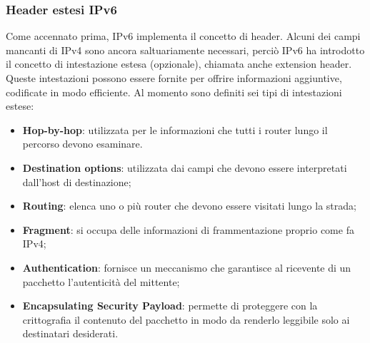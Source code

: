             \subsubsection*{Header estesi IPv6}
            Come accennato prima, IPv6 implementa il concetto di header. Alcuni dei campi mancanti di
            IPv4 sono ancora saltuariamente necessari, perciò IPv6 ha introdotto il concetto di intestazione
            estesa (opzionale), chiamata anche extension header. Queste intestazioni possono essere
            fornite per offrire informazioni aggiuntive, codificate in modo efficiente. Al momento sono
            definiti sei tipi di intestazioni estese:

            \begin{itemize}
                \item \textbf{Hop-by-hop}: utilizzata per le informazioni che tutti i router lungo il percorso devono
                esaminare.
                \item \textbf{Destination options}: utilizzata dai campi che devono essere interpretati dall’host di
                destinazione;
                \item \textbf{Routing}: elenca uno o più router che devono essere visitati lungo la strada;
                \item \textbf{Fragment}: si occupa delle informazioni di frammentazione proprio come fa IPv4;
                \item \textbf{Authentication}: fornisce un meccanismo che garantisce al ricevente di un pacchetto
                l’autenticità del mittente;
                \item \textbf{Encapsulating Security Payload}: permette di proteggere con la crittografia il
                contenuto del pacchetto in modo da renderlo leggibile solo ai destinatari desiderati.
            \end{itemize}
            
